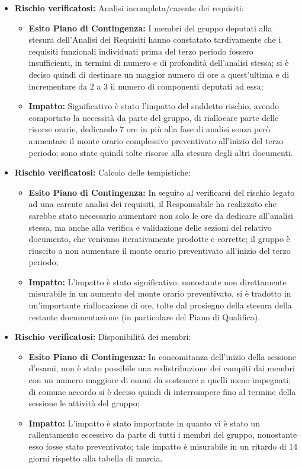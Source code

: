 \begin{itemize}
\item \textbf{Rischio verificatosi:} Analisi incompleta/carente dei requisiti:
\begin{itemize}
\item \textbf{Esito Piano di Contingenza:} I membri del gruppo deputati alla stesura dell'Analisi dei Requisiti hanno constatato tardivamente che i requisiti funzionali individuati prima del terzo periodo fossero insufficienti, in termini di numero e di profondità dell'analisi stessa; si è deciso quindi di destinare un maggior numero di ore a quest'ultima e di incrementare da 2 a 3 il numero di componenti deputati ad essa;
\item \textbf{Impatto:} Significativo è stato l'impatto del suddetto rischio, avendo comportato la necessità da parte del gruppo, di riallocare parte delle risorse orarie, dedicando 7 ore in più alla fase di analisi senza però aumentare il monte orario complessivo preventivato all'inizio del terzo periodo; sono state quindi tolte risorse alla stesura degli altri documenti.
\end{itemize}

\item \textbf{Rischio verificatosi:} Calcolo delle tempistiche:
\begin{itemize}
\item \textbf{Esito Piano di Contingenza:} In seguito al verificarsi del rischio legato ad una carente analisi dei requisiti, il Responsabile ha realizzato che sarebbe stato necessario aumentare non solo le ore da dedicare all'analisi stessa, ma anche alla verifica e validazione delle sezioni del relativo documento, che venivano iterativamente prodotte e corrette; il gruppo è riuscito a non aumentare il monte orario preventivato all'inizio del terzo periodo;
\item \textbf{Impatto:} L'impatto è stato significativo; nonostante non direttamente misurabile in un aumento del monte orario preventivato, si è tradotto in un'importante riallocazione di ore, tolte dal prosieguo della stesura della restante documentazione (in particolare del Piano di Qualifica).
\end{itemize}

\item \textbf{Rischio verificatosi:} Disponibilità dei membri:
\begin{itemize}
    \item \textbf{Esito Piano di Contingenza:} In concomitanza dell'inizio della sessione d'esami, non è stato possibile una redistribuzione dei compiti dai membri con un numero maggiore di esami da sostenere a quelli meno impegnati; di comune accordo si è deciso quindi di interrompere fino al termine della sessione le attività del gruppo;
    \item \textbf{Impatto:} L'impatto è stato importante in quanto vi è stato un rallentamento eccessivo da parte di tutti i membri del gruppo, nonostante esso fosse stato preventivato; tale impatto è misurabile in un ritardo di 14 giorni rispetto alla tabella di marcia.
\end{itemize}
\end{itemize}

